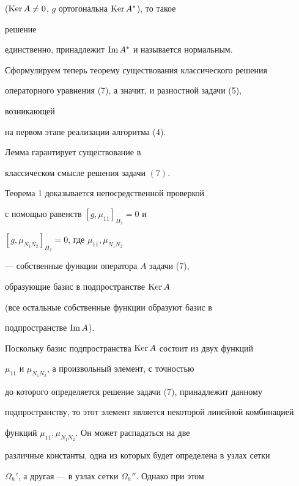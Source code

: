 ($\operatorname{Ker} A\ne 0$, $g$ ортогональна $\operatorname{Ker} A^*$), то такое


решение


единственно, принадлежит $\operatorname{Im} A^*$ и называется нормальным.





Сформулируем теперь теорему существования классического решения


операторного уравнения (7), а значит, и разностной задачи (5),


возникающей


на первом этапе реализации алгоритма (4).





\begin{thm}


Лемма гарантирует существование в


классическом смысле решения задачи $(7)$.


\end{thm}





Теорема 1 доказывается непосредственной проверкой


с помощью равенств $[g,\mu_{11}]_{H_2}=0$ и


$[g,\mu_{N_1N_2}]_{H_2}=0$, где $\mu_{11},\mu_{N_1N_2}$


--- собственные функции оператора $A$ задачи (7),


образующие базис в подпространстве $\operatorname{Ker} A$


(все остальные собственные функции образуют базис в


подпространстве $\operatorname{Im} A$).





Поскольку базис подпространства $\operatorname{Ker} A$ состоит из двух функций


$\mu_{11}$ и $\mu_{N_1N_2}$, а произвольный элемент, с точностью


до которого определяется решение задачи (7), принадлежит данному


подпространству, то этот элемент является некоторой линейной комбинацией


функций $\mu_{11},\mu_{N_1N_2}$. Он может распадаться на две


различные константы, одна из которых будет определена в узлах сетки


$\Omega_h'$, а другая --- в узлах сетки $\Omega_h''$. Однако при этом


